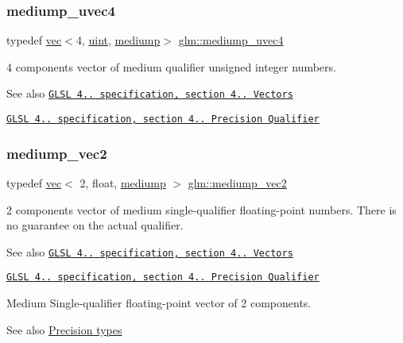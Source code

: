 \subsubsection{\texorpdfstring{mediump\+\_\+uvec4}{mediump\_uvec4}}
{\footnotesize\ttfamily typedef \hyperlink{structglm_1_1vec}{vec}$<$4, \hyperlink{group__core__precision_ga4fd29415871152bfb5abd588334147c8}{uint}, \hyperlink{namespaceglm_a36ed105b07c7746804d7fdc7cc90ff25a6416f3ea0c9025fb21ed50c4d6620482}{mediump}$>$ \hyperlink{group__core__precision_ga204494f26e258e26882acf5288415ebd}{glm\+::mediump\+\_\+uvec4}}

4 components vector of medium qualifier unsigned integer numbers.

\begin{DoxySeeAlso}{See also}
\href{http://www.opengl.org/registry/doc/GLSLangSpec.4.20.8.pdf}{\tt G\+L\+SL 4.. specification, section 4.. Vectors} 

\href{http://www.opengl.org/registry/doc/GLSLangSpec.4.20.8.pdf}{\tt G\+L\+SL 4.. specification, section 4.. Precision Qualifier} 
\end{DoxySeeAlso}
\mbox{\label{group__core__precision_ga96e0011dd4d124d28fd52ef2f0c6f299}} 
\subsubsection{\texorpdfstring{mediump\+\_\+vec2}{mediump\_vec2}}
{\footnotesize\ttfamily typedef \hyperlink{structglm_1_1vec}{vec}$<$ 2, float, \hyperlink{namespaceglm_a36ed105b07c7746804d7fdc7cc90ff25a6416f3ea0c9025fb21ed50c4d6620482}{mediump} $>$ \hyperlink{group__core__precision_ga96e0011dd4d124d28fd52ef2f0c6f299}{glm\+::mediump\+\_\+vec2}}

2 components vector of medium single-\/qualifier floating-\/point numbers. There is no guarantee on the actual qualifier.

\begin{DoxySeeAlso}{See also}
\href{http://www.opengl.org/registry/doc/GLSLangSpec.4.20.8.pdf}{\tt G\+L\+SL 4.. specification, section 4.. Vectors} 

\href{http://www.opengl.org/registry/doc/GLSLangSpec.4.20.8.pdf}{\tt G\+L\+SL 4.. specification, section 4.. Precision Qualifier}
\end{DoxySeeAlso}
Medium Single-\/qualifier floating-\/point vector of 2 components. \begin{DoxySeeAlso}{See also}
\hyperlink{group__core__precision}{Precision types} 
\end{DoxySeeAlso}
\mbox{\label{group__core__precision_ga709e6ab33a5deb4a42ce9fcde75655f3}} 

